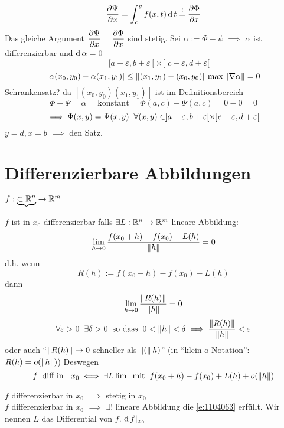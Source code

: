 \begin{Bew}
\begin{equation}
  \end{equation}
  \[\dfrac{\partial \Psi}{\partial x}=\int_c^yf(x,t)\operatorname{d} t\stackrel{!}{=}\dfrac{\partial \Phi}{\partial x}\]
  Das gleiche Argument $\dfrac{\partial \Psi}{\partial x}=\dfrac{\partial \Phi}{\partial x}$ sind stetig. Sei $\alpha:=\Phi-\psi$ $\implies$ $\alpha$ ist differenzierbar und $\operatorname{d} \alpha=0$
  \[=[a-\varepsilon, b+\varepsilon[\times ]c-\varepsilon,d+\varepsilon [\]
  \[\mathopen| \alpha(x_0,y_0)-\alpha(x_1,y_1) \mathclose|\leq\left\| (x_1,y_1)-(x_0,y_0) \right\|\max\left\| \nabla\alpha \right\|=0\]
  Schrankensatz? da $[(x_0,y_0)(x_1,y_1)]$ ist im Definitionsbereich
  \[\Phi-\Psi=\alpha=\text{konstant}=\Phi(a,c)-\Psi(a,c)=0-0=0\]
  \[\implies \Phi(x,y)=\Psi(x,y) \hspace{2mm}\forall (x,y)\in ]a-\varepsilon,b+\varepsilon [\times ]c-\varepsilon, d+\varepsilon [\]
  $y=d,x=b$ $\implies$ den Satz.
\end{Bew}
\section{Differenzierbare Abbildungen}
$f:\underbrace{\subset\mathbb{R}^n}\rightarrow\mathbb{R}^m$
\begin{Def}
  $f$ ist in $x_0$ differenzierbar falls $\exists L:\mathbb{R}^n\rightarrow\mathbb{R}^m$ lineare Abbildung:
  \[\displaystyle\lim_{h\rightarrow0}\frac{f(x_0+h)-f(x_0)-L(h)}{\left\| h \right\|}=0\]
  d.h. wenn 
  \[R(h):=f(x_0+h)-f(x_0)-L(h)\]
  dann
  \[\displaystyle\lim_{h\rightarrow0}\frac{\left\| R(h) \right\|}{\left\| h \right\|}=0\]
  \[\forall \varepsilon>0\hspace{2mm}\exists\delta>0\hspace{2mm}\text{so dass}\hspace{2mm}0<\left\| h \right\|<\delta\implies \frac{\left\| R(h) \right\|}{\left\| h \right\|}<\varepsilon\]
  oder auch ``$\left\| R(h) \right\|\rightarrow 0$ schneller als $\left\| ( \right\|h)$'' (in ``klein-o-Notation'': $R(h)=o(\left\| h \right\|)$) Deswegen
  \begin{equation}
    \label{e:1104063}
    f\hspace{2mm}\text{diff in }\hspace{2mm} x_0\iff \exists L \lim\hspace{2mm}\text{mit}\hspace{2mm} f(x_0+h)-f(x_0)+L(h)+o(\left\| h \right\|)
  \end{equation}
\end{Def}
\begin{Bem}
  $f$ differenzierbar in $x_0$ $\implies$ stetig in $x_0$\\
  $f$ differenzierbar in $x_0$ $\implies$ $\exists !$ lineare Abbildung die \ref{e:1104063} erfüllt. Wir nennen $L$ das Differential von $f$. $\operatorname{d} f|_{x_0}$
\end{Bem}
